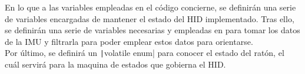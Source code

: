 \documentclass[a4paper,twoside]{article}
\begin{document}
En lo que a las variables empleadas en el código concierne, se definirán una serie de variables encargadas de mantener el estado del HID implementado. Tras ello, se definirán una serie de variables necesarias y empleadas en para tomar los datos de la IMU y filtrarla para poder emplear estos datos para orientarse.\\
Por último, se definirá un \texttt|volatile enum| para conocer el estado del ratón, el cuál servirá para la maquina de estados que gobierna el HID.
\begin{mdframed}[linecolor=black, topline=false, bottomline=false, leftline=false, rightline=false]
\inputminted[linenos,breaklines,frame=lines,framesep=2mm]{c}{codes/variables1.c}
\end{mdframed}

\vspace{3cm}
\end{document}
